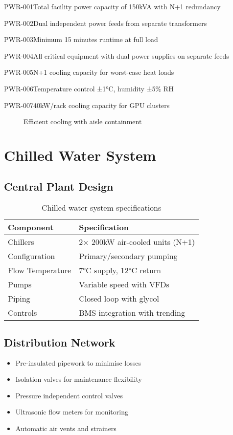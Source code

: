 \begin{requirement}{PWR-001}{Total facility power capacity of 150kVA with N+1 redundancy}
\begin{requirement}{PWR-002}{Dual independent power feeds from separate transformers}
\begin{requirement}{PWR-003}{Minimum 15 minutes runtime at full load}
\begin{requirement}{PWR-004}{All critical equipment with dual power supplies on separate feeds}
\begin{requirement}{PWR-005}{N+1 cooling capacity for worst-case heat loads}
\begin{requirement}{PWR-006}{Temperature control ±1°C, humidity ±5\% RH}
\begin{requirement}{PWR-007}{40kW/rack cooling capacity for GPU clusters}
\begin{figure}[H]
\caption{Efficient cooling with aisle containment}
\end{figure}

\section{Chilled Water System}

\subsection{Central Plant Design}

\begin{table}[H]
\centering
\begin{tabularx}{\textwidth}{@{}lX@{}}
\toprule
\textbf{Component} & \textbf{Specification} \\
\midrule
Chillers & 2× 200kW air-cooled units (N+1) \\
Configuration & Primary/secondary pumping \\
Flow Temperature & 7°C supply, 12°C return \\
Pumps & Variable speed with VFDs \\
Piping & Closed loop with glycol \\
Controls & BMS integration with trending \\
\bottomrule
\end{tabularx}
\caption{Chilled water system specifications}
\end{table}

\subsection{Distribution Network}

\begin{itemize}
    \item Pre-insulated pipework to minimise losses
    \item Isolation valves for maintenance flexibility
    \item Pressure independent control valves
    \item Ultrasonic flow meters for monitoring
    \item Automatic air vents and strainers
\end{itemize}


\end{requirement}
\end{requirement}
\end{requirement}
\end{requirement}
\end{requirement}
\end{requirement}
\end{requirement}
